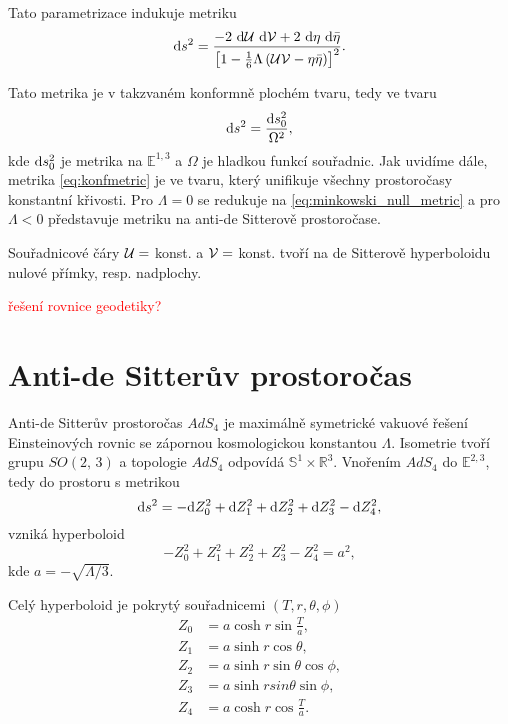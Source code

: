 Tato parametrizace indukuje metriku
\begin{equation}
     \label{eq:konfmetric}
     \mathrm{d} s^2 = \frac{-2 ~ \mathrm{d} \mathcal{U} ~ \mathrm{d} \mathcal{V} + 2 ~ \mathrm{d} \eta ~ \mathrm{d} \bar{\eta}}{\left[1-\tfrac{1}{6} \Lambda \left(\mathcal{U} \mathcal{V} - \eta \bar{\eta}\right)\right]^2}.
\end{equation}

Tato metrika je v takzvaném konformně plochém tvaru, tedy ve tvaru
\begin{equation}
     \mathrm{d} s^2 = \frac{\mathrm{d} s_0^2}{\Omega^2},
\end{equation}
kde $\mathrm{d} s_0^2$ je metrika na $\mathbb{E}^{1,3}$ a $\Omega$ je hladkou funkcí souřadnic. Jak uvidíme dále,
metrika \eqref{eq:konfmetric} je ve tvaru, který unifikuje všechny prostoročasy konstantní křivosti.
Pro $\Lambda = 0$ se redukuje na \eqref{eq:minkowski_null_metric} a pro $\Lambda < 0$ představuje metriku na
anti-de Sitterově prostoročase.

Souřadnicové čáry $\mathcal{U} =$ konst. a $\mathcal{V} =$ konst. tvoří na de Sitterově hyperboloidu nulové
přímky, resp. nadplochy.

\textcolor{red}{řešení rovnice geodetiky?}

\section{Anti-de Sitterův prostoročas}

Anti-de Sitterův prostoročas $AdS_4$ je maximálně symetrické vakuové řešení Einsteinových rovnic se zápornou
kosmologickou konstantou $\Lambda$. Isometrie tvoří grupu $SO(2,\,3)$ a topologie $AdS_4$ odpovídá $\mathbb{S}^1 \times \mathbb{R}^3$.
Vnořením $AdS_4$ do $\mathbb{E}^{2,3}$, tedy do prostoru s metrikou
\begin{equation}
     \label{eq:AdS5DMetric}
     \mathrm{d} s^2 = -\mathrm{d} Z_0^2 + \mathrm{d} Z_1^2 + \mathrm{d} Z_2^2 + \mathrm{d} Z_3^2 - \mathrm{d} Z_4^2,
\end{equation}
vzniká hyperboloid
\begin{equation}
     \label{eq:AdS_hyperboloid}
     -Z_0^2 + Z_1^2 + Z_2^2 + Z_3^2 - Z_4^2 = a^2,
\end{equation}
kde $a = -\sqrt{\Lambda/3}$.

Celý hyperboloid je pokrytý souřadnicemi $(T, r, \theta, \phi)$
\begin{equation}
     \begin{split}
          Z_0 &= a \cosh r \sin \frac{T}{a}, \\
          Z_1 &= a \sinh r \cos \theta, \\
          Z_2 &= a \sinh r \sin \theta \cos \phi, \\
          Z_3 &= a \sinh r sin \theta \sin \phi, \\
          Z_4 &= a \cosh r \cos \frac{T}{a}.
     \end{split}
\end{equation}

